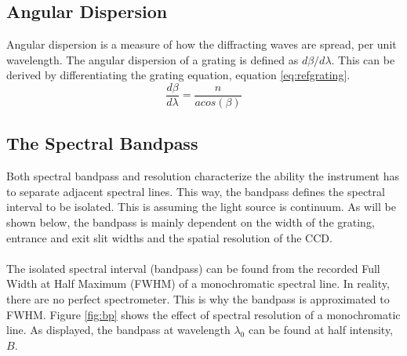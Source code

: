 \subsection{Angular Dispersion}
Angular dispersion is a measure of how the diffracting waves are spread, per unit wavelength. The angular dispersion of a grating is defined as $d\beta/d\lambda$. This can be derived by differentiating the grating equation, equation \ref{eq:refgrating}. 
\begin{equation}
    \frac{d\beta}{d\lambda} = \frac{n}{a cos(\beta)}
    \label{eq:angdisp}
\end{equation}

\subsection{The Spectral Bandpass}
Both spectral bandpass and resolution characterize the ability the instrument has to separate adjacent spectral lines. This way, the bandpass defines the spectral interval to be isolated. This is assuming the light source is continuum. As will be shown below, the bandpass is mainly dependent on  the width of the grating, entrance and exit slit widths and the spatial resolution of the CCD. 
\\\\
The isolated spectral interval (bandpass) can be found from the recorded Full Width at Half Maximum (FWHM) of a monochromatic spectral line. In reality, there are no perfect spectrometer. This is why the bandpass is approximated to FWHM. Figure \ref{fig:bp} shows the effect of spectral resolution of a monochromatic line. As displayed, the bandpass at wavelength $\lambda_0$ can be found at half intensity, $B$. 

